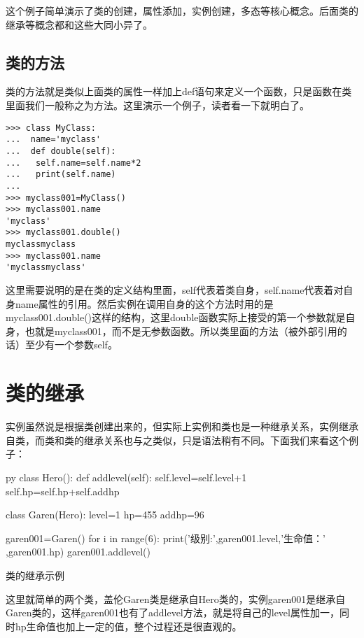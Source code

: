 \documentclass[12pt,oneside]{book}
\begin{document}
\begin{common-format}
这个例子简单演示了类的创建，属性添加，实例创建，多态等核心概念。后面类的继承等概念都和这些大同小异了。


\subsection{类的方法}
类的方法就是类似上面类的属性一样加上def语句来定义一个函数，只是函数在类里面我们一般称之为方法。这里演示一个例子，读者看一下就明白了。
\begin{Verbatim}
>>> class MyClass:
...  name='myclass'
...  def double(self):
...   self.name=self.name*2
...   print(self.name)
... 
>>> myclass001=MyClass()
>>> myclass001.name
'myclass'
>>> myclass001.double()
myclassmyclass
>>> myclass001.name
'myclassmyclass'
\end{Verbatim}

这里需要说明的是在类的定义结构里面，self代表着类自身，self.name代表着对自身name属性的引用。然后实例在调用自身的这个方法时用的是myclass001.double()这样的结构，这里double函数实际上接受的第一个参数就是自身，也就是myclass001，而不是无参数函数。所以类里面的方法（被外部引用的话）至少有一个参数self。





\section{类的继承}
实例虽然说是根据类创建出来的，但实际上实例和类也是一种继承关系，实例继承自类，而类和类的继承关系也与之类似，只是语法稍有不同。下面我们来看这个例子：
\begin{xverbatim}[129]{py}
class Hero():
    def addlevel(self):
        self.level=self.level+1
        self.hp=self.hp+self.addhp

class Garen(Hero):
    level=1
    hp=455
    addhp=96

garen001=Garen()
for i in range(6):
    print('级别:',garen001.level,'生命值：' ,garen001.hp)
    garen001.addlevel()
\end{xverbatim}

\begin{fig}[0.5]{类的继承示例}
\caption{类的继承示例}
\label{fig:类的继承示例}
\end{fig}

这里就简单的两个类，盖伦Garen类是继承自Hero类的，实例garen001是继承自Garen类的，这样garen001也有了addlevel方法，就是将自己的level属性加一，同时hp生命值也加上一定的值，整个过程还是很直观的。



\end{common-format}
\end{document}
